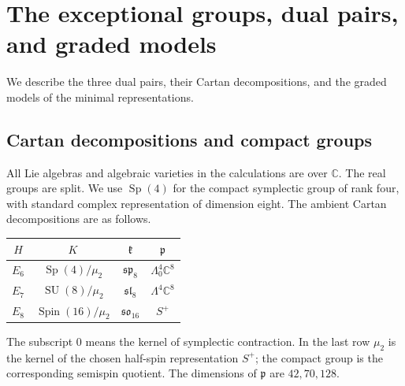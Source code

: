 \documentclass[11pt]{article}
\newcommand{\C}{\mathbb C}
\newcommand{\SU}{\operatorname{SU}}
\newcommand{\Sp}{\operatorname{Sp}}
\newcommand{\Spin}{\operatorname{Spin}}
\newcommand{\fk}{\mathfrak k}
\newcommand{\fp}{\mathfrak p}
\theoremstyle{definition}
\numberwithin{equation}{section}
\begin{document}
\section{The exceptional groups, dual pairs, and graded models}\label{sec:setup}
We describe the three dual pairs, their Cartan decompositions, and the
graded models of the minimal representations.

\subsection{Cartan decompositions and compact groups}
All Lie algebras and algebraic varieties in the calculations are over
$\C$. The real groups are split. We use $\Sp(4)$ for the compact
symplectic group of rank four, with standard complex representation of
dimension eight. The ambient Cartan decompositions are as follows.
\begin{center}
\begin{tabular}{c c c c}
\toprule
$H$ & $K$ & $\fk$ & $\fp$ \\
\midrule
$E_6$ & $\Sp(4)/\mu_2$ & $\mathfrak{sp}_8$ & $\Lambda^4_0\C^8$ \\
$E_7$ & $\SU(8)/\mu_2$ & $\mathfrak{sl}_8$ & $\Lambda^4\C^8$ \\
$E_8$ & $\Spin(16)/\mu_2$ & $\mathfrak{so}_{16}$ & $S^+$ \\
\bottomrule
\end{tabular}
\end{center}
The subscript $0$ means the kernel of symplectic contraction. In the last
row $\mu_2$ is the kernel of the chosen half-spin representation $S^+$;
the compact group is the corresponding semispin quotient.
The dimensions of $\fp$ are $42,70,128$.
\end{document}
